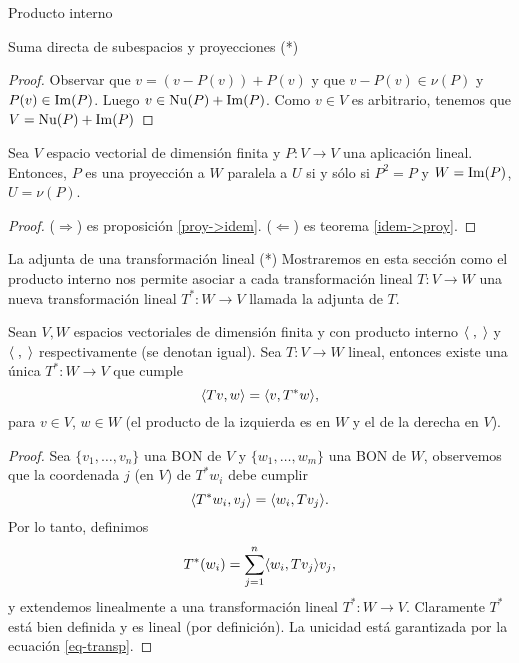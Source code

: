 \begin{chapter}{Producto interno}
\begin{section}{Suma directa de subespacios y proyecciones  (*)}
\begin{proof}
			Observar que $v = (v -P(v)) + P(v)$ y que $v -P(v)\in \nu(P)$ y $P(v) \in \operatorname{Im}(P)$. Luego $v \in \operatorname{Nu}(P) + \operatorname{Im}(P)$. Como $v \in V$ es arbitrario,  tenemos que $V= \operatorname{Nu}(P) + \operatorname{Im}(P)$
		\end{proof}

		\begin{teorema} 
			Sea $V$ espacio vectorial de dimensión finita y $P:V \to V$ una aplicación lineal. Entonces, $P$ es una proyección a $W$ paralela a  $U$ si y sólo si $P^2 = P$ y $W= \operatorname{Im}(P)$, $U = \nu(P)$. 
		\end{teorema}
		\begin{proof} ($\Rightarrow$) es proposición \ref{proy->idem}. ($\Leftarrow$) es teorema \ref{idem->proy}.
        \end{proof}
		
	\end{section}


    \begin{section}{La adjunta de una transformaci\'on lineal (*)}\label{seccion-adjunta-de-una-transformacion-lineal} Mostraremos en esta sección como el producto interno nos permite asociar a cada transformación lineal $T: V \to W$ una nueva transformación  lineal $T^*: W \to V$ llamada la adjunta de $T$. 
	
        \begin{teorema}
            Sean $V, W$ espacios vectoriales de dimensión finita y con producto interno $\langle \;,\;\rangle$ y $\langle \;,\;\rangle$ respectivamente (se denotan igual). Sea $T: V \to W$ lineal, entonces existe una única $T^*: W \to V$ que cumple
            \begin{equation}\label{eq-adjunta}
            \langle Tv,w\rangle = \langle v,T^*w\rangle,
            \end{equation}  
            para $v\in V$, $w \in W$ (el producto de la izquierda es en $W$ y el de la derecha en $V$).
        \end{teorema}
        \begin{proof}
        Sea $\{v_1,\ldots,v_n\}$ una BON de $V$ y $\{w_1,\ldots,w_m\}$ una BON de $W$, observemos que la coordenada $j$ (en $V$) de $T^*w_i$ debe cumplir
        \begin{equation}\label{eq-transp}
            \langle T^*w_i,v_j\rangle = 	\langle w_i,Tv_j\rangle.
        \end{equation}
        Por lo tanto,  definimos
        \begin{equation*}
            T^*(w_i) = \sum_{j=1}^{n} \langle w_i,Tv_j\rangle v_j,
        \end{equation*}
        y extendemos linealmente a una transformación lineal $T^*: W \to V$. Claramente $T^*$   está bien definida y es lineal (por definición).  La unicidad está garantizada por la ecuación \eqref{eq-transp}.  
        

\end{proof}
\end{section}
\end{chapter}
